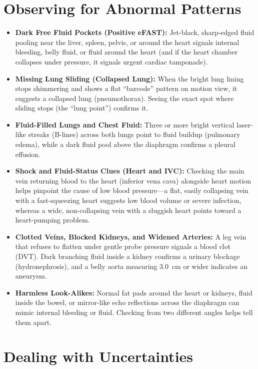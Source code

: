 \section{Observing for Abnormal Patterns}

\begin{itemize}
    \item \textbf{Dark Free Fluid Pockets (Positive eFAST):} Jet-black, sharp-edged fluid pooling near the liver, spleen, pelvis, or around the heart signals internal bleeding, belly fluid, or fluid around the heart (and if the heart chamber collapses under pressure, it signals urgent cardiac tamponade).
    \item \textbf{Missing Lung Sliding (Collapsed Lung):} When the bright lung lining stops shimmering and shows a flat ``barcode'' pattern on motion view, it suggests a collapsed lung (pneumothorax). Seeing the exact spot where sliding stops (the ``lung point'') confirms it.
    \item \textbf{Fluid-Filled Lungs and Chest Fluid:} Three or more bright vertical laser-like streaks (B-lines) across both lungs point to fluid buildup (pulmonary edema), while a dark fluid pool above the diaphragm confirms a pleural effusion.
    \item \textbf{Shock and Fluid-Status Clues (Heart and IVC):} Checking the main vein returning blood to the heart (inferior vena cava) alongside heart motion helps pinpoint the cause of low blood pressure---a flat, easily collapsing vein with a fast-squeezing heart suggests low blood volume or severe infection, whereas a wide, non-collapsing vein with a sluggish heart points toward a heart-pumping problem.
    \item \textbf{Clotted Veins, Blocked Kidneys, and Widened Arteries:} A leg vein that refuses to flatten under gentle probe pressure signals a blood clot (DVT). Dark branching fluid inside a kidney confirms a urinary blockage (hydronephrosis), and a belly aorta measuring 3.0~cm or wider indicates an aneurysm.
    \item \textbf{Harmless Look-Alikes:} Normal fat pads around the heart or kidneys, fluid inside the bowel, or mirror-like echo reflections across the diaphragm can mimic internal bleeding or fluid. Checking from two different angles helps tell them apart.
\end{itemize}

\section{Dealing with Uncertainties}

